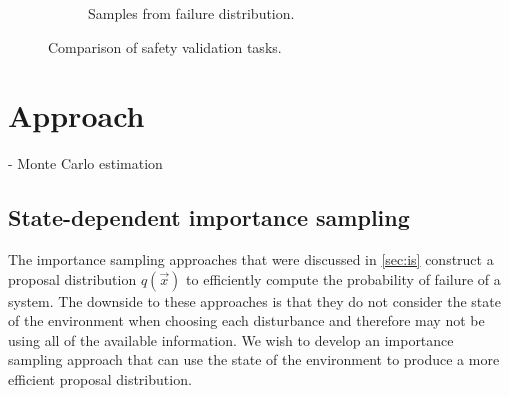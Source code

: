 \begin{figure}
\begin{subfigure}[b]{0.45\textwidth}
        \caption{Samples from failure distribution.}
        \label{fig:dof_dof}
    \end{subfigure}
    \caption{Comparison of safety validation tasks.}
    \label{fig:dof_comparison_safetytasks}
\end{figure}





\section{Approach}


- Monte Carlo estimation

\subsection{State-dependent importance sampling}

The importance sampling approaches that were discussed in \cref{sec:is} construct a proposal distribution $q(\vec{x})$ to efficiently compute the probability of failure of a system. The downside to these approaches is that they do not consider the state of the environment when choosing each disturbance and therefore may not be using all of the available information. We wish to develop an importance sampling approach that can use the state of the environment to produce a more efficient proposal distribution. 


